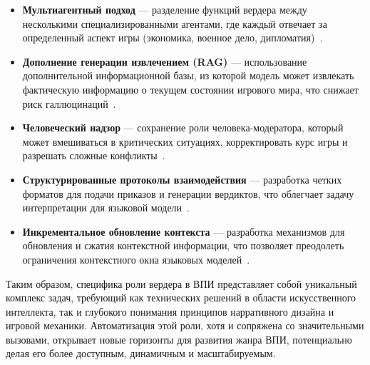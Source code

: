 \begin{itemize}
    \item \textbf{Мультиагентный подход} — разделение функций вердера между несколькими специализированными агентами, где каждый отвечает за определенный аспект игры (экономика, военное дело, дипломатия)~\cite{multi-agent-systems}.

    \item \textbf{Дополнение генерации извлечением (RAG)} — использование дополнительной информационной базы, из которой модель может извлекать фактическую информацию о текущем состоянии игрового мира, что снижает риск галлюцинаций~\cite{rag-applications}.

    \item \textbf{Человеческий надзор} — сохранение роли человека-модератора, который может вмешиваться в критических ситуациях, корректировать курс игры и разрешать сложные конфликты~\cite{human-ai-collaboration}.

    \item \textbf{Структурированные протоколы взаимодействия} — разработка четких форматов для подачи приказов и генерации вердиктов, что облегчает задачу интерпретации для языковой модели~\cite{llm-applications}.

    \item \textbf{Инкрементальное обновление контекста} — разработка механизмов для обновления и сжатия контекстной информации, что позволяет преодолеть ограничения контекстного окна языковых моделей~\cite{llm-context-window}.
\end{itemize}

Таким образом, специфика роли вердера в ВПИ представляет собой уникальный комплекс задач, требующий как технических решений в области искусственного интеллекта, так и глубокого понимания принципов нарративного дизайна и игровой механики. Автоматизация этой роли, хотя и сопряжена со значительными вызовами, открывает новые горизонты для развития жанра ВПИ, потенциально делая его более доступным, динамичным и масштабируемым.
